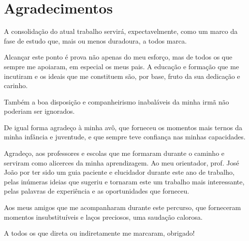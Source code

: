 \chapter*{Agradecimentos}
\setlength{\parskip}{1em}

A consolidação do atual trabalho servirá, expectavelmente, como um marco da fase de estudo que, mais ou menos duradoura, a todos marca.

Alcançar este ponto é prova não apenas do meu esforço, mas de todos os que sempre me apoiaram, em especial os meus pais. A educação e formação que me incutiram e os ideais que me constituem são, por base, fruto da sua dedicação e carinho. 

Também a boa disposição e companheirismo inabaláveis da minha irmã não poderiam ser ignorados.

De igual forma agradeço à minha avô, que forneceu os momentos mais ternos da minha infância e juventude, e que sempre teve confiança nas minhas capacidades. 

Agradeço, aos professores e escolas que me formaram durante o caminho e serviram como alicerces da minha aprendizagem. Ao meu orientador, prof. José João por ter sido um guia paciente e elucidador durante este ano de trabalho, pelas inúmeras ideias que sugeriu e tornaram este um trabalho mais interessante, pelas palavras de experiência e as oportunidades que forneceu.

Aos meus amigos que me acompanharam durante este percurso, que forneceram momentos insubstituíveis e laços preciosos, uma saudação calorosa.

A todos os que direta ou indiretamente me marcaram, obrigado!

\setlength{\parskip}{0em}